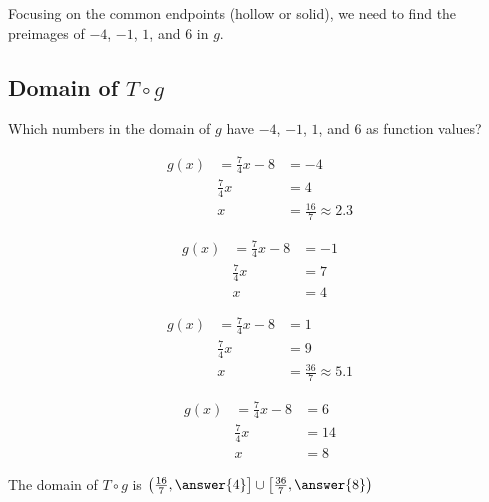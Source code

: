 \documentclass{ximera}
\begin{document}
Focusing on the common endpoints (hollow or solid), we need to find the preimages of $-4$, $-1$, $1$, and $6$ in $g$. 
















\subsection*{Domain of $T \circ g$}

Which numbers in the domain of $g$ have $-4$, $-1$, $1$, and $6$ as function values? 


\begin{explanation}



\begin{align*}
g(x) & = \frac{7}{4}x - 8 & = -4 \\
     &  \frac{7}{4}x     & = 4  \\
     &  x                & = \frac{16}{7} \approx 2.3
\end{align*}





\begin{align*}
g(x) & = \frac{7}{4}x - 8 & = -1 \\
     &  \frac{7}{4}x     & = 7  \\
     &  x                & = 4
\end{align*}




\begin{align*}
g(x) & = \frac{7}{4}x - 8 & = 1 \\
     &  \frac{7}{4}x     & = 9  \\
     &  x                & = \frac{36}{7} \approx 5.1
\end{align*}





\begin{align*}
g(x) & = \frac{7}{4}x - 8 & = 6 \\
     &  \frac{7}{4}x     & = 14  \\
     &  x                & = 8
\end{align*}






The domain of $T \circ g$ is $\left( \frac{16}{7}, \answer{4} \right] \cup \left[ \frac{36}{7}, \answer{8} \right)$ 


\end{explanation}
\end{document}
